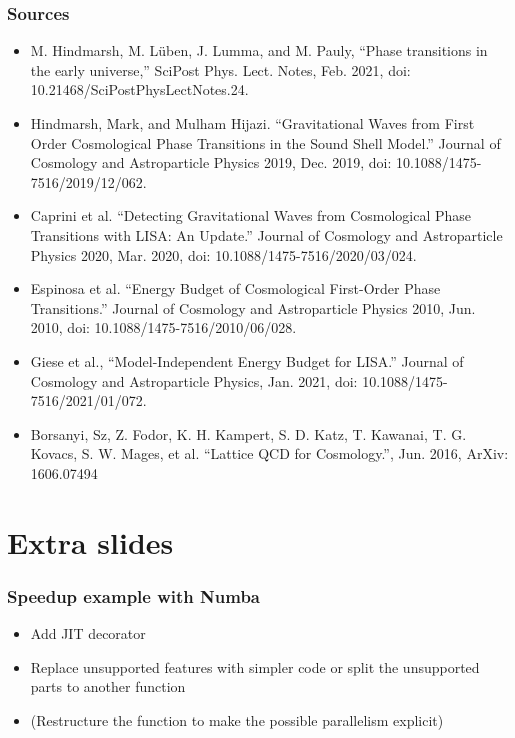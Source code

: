 \begin{frame}
    \frametitle{Sources}
    \begin{itemize}
        \scriptsize
        \item M. Hindmarsh, M. Lüben, J. Lumma, and M. Pauly, “Phase transitions in the early universe,” SciPost Phys. Lect. Notes, Feb. 2021, doi: 10.21468/SciPostPhysLectNotes.24.
        \item Hindmarsh, Mark, and Mulham Hijazi. “Gravitational Waves from First Order Cosmological Phase Transitions in the Sound Shell Model.” Journal of Cosmology and Astroparticle Physics 2019, Dec. 2019, doi: 10.1088/1475-7516/2019/12/062.
        \item Caprini et al. “Detecting Gravitational Waves from Cosmological Phase Transitions with LISA: An Update.” Journal of Cosmology and Astroparticle Physics 2020, Mar. 2020, doi: 10.1088/1475-7516/2020/03/024.
        \item Espinosa et al. “Energy Budget of Cosmological First-Order Phase Transitions.” Journal of Cosmology and Astroparticle Physics 2010, Jun. 2010, doi: 10.1088/1475-7516/2010/06/028.
        \item Giese et al., “Model-Independent Energy Budget for LISA.” Journal of Cosmology and Astroparticle Physics, Jan. 2021, doi: 10.1088/1475-7516/2021/01/072.
        \item Borsanyi, Sz, Z. Fodor, K. H. Kampert, S. D. Katz, T. Kawanai, T. G. Kovacs, S. W. Mages, et al. “Lattice QCD for Cosmology.”, Jun. 2016, ArXiv: 1606.07494
    \end{itemize}
\end{frame}

\begin{frame}
\end{frame}

\section{Extra slides}

\begin{frame}
    \frametitle{Speedup example with Numba}
    \begin{itemize}
        \item Add JIT decorator
        \item Replace unsupported features with simpler code or split the unsupported parts to another function
        \item (Restructure the function to make the possible parallelism explicit)
    \end{itemize}
    {
        \scriptsize
        
    }
\end{frame}

